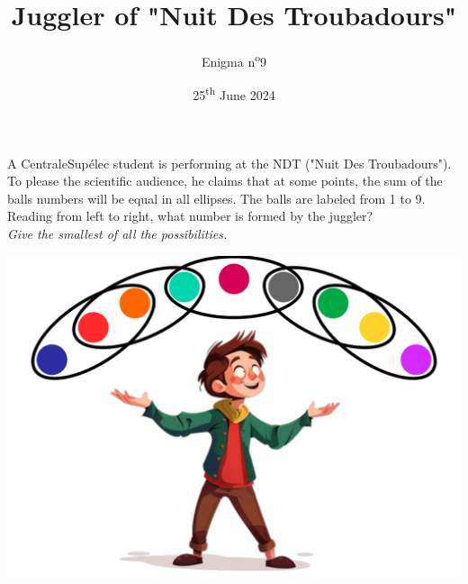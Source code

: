 \documentclass[a4paper, top=10mm]{article}
\title{\textbf{\huge{Juggler of "Nuit Des Troubadours"}}}
\author{Enigma n\textsuperscript{o}9}
\date{25\textsuperscript{th} June 2024}
\begin{document}
	\maketitle
	
	\Large
	A CentraleSupélec student is performing at the NDT ("Nuit Des Troubadours").
	To please the scientific audience, he claims that at some points, the sum of the balls numbers will be equal in all ellipses.
	The balls are labeled from 1 to 9.\\
	Reading from left to right, what number is formed by the juggler?\\
	\textit{Give the smallest of all the possibilities.}
	
	\vspace{2cm}
	
	\begin{center}
		\includegraphics[width=\linewidth]{09juggler.pdf}
	\end{center}
	
	
	
\end{document}
